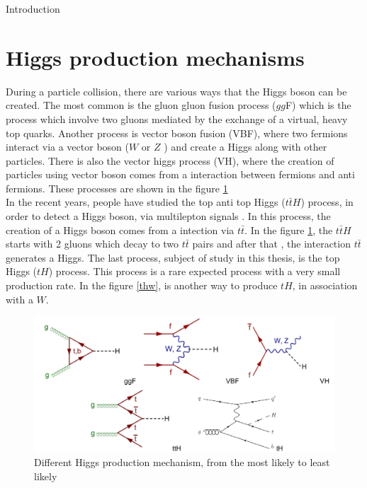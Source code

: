 \begin{chapter}{Introduction}
\pagebreak



\section{Higgs production mechanisms}
During a particle collision, there are various ways that the Higgs boson can be created. The most common is the gluon gluon fusion process ($gg$F) which is the process which involve two gluons  mediated by the exchange of a virtual, heavy top
quarks.  Another process  is vector boson fusion (VBF), where two fermions interact via a vector boson ($W$ or $Z$ ) and create a Higgs along with other particles. There is also the vector higgs process (VH), where the creation of particles using vector boson comes from a interaction between fermions and anti fermions\cite{pd}. These processes are shown in the figure \ref{psu} \\

In the recent years, people have studied the top anti top Higgs  ($t\bar{t}H$) process, in order to detect a Higgs boson, via multilepton signals \cite{th1}.
In this process, the creation of a Higgs boson comes from a intection via $t\bar{t}$. In the figure \ref{psu}, the $t\bar{t}H$ starts with 2 gluons which decay to two $t\bar{t}$ pairs and after that , the interaction $t\bar{t}$  generates a Higgs. The last process, subject of study in this thesis, is the top Higgs ($tH$) process. This process is a rare expected process with a very small production rate\cite{pd}.  In the figure \ref{thw}, is another way to produce $tH$, in association with a $W$.

\begin{figure}[htbp]
\centering
\includegraphics[scale=0.5]{Chapter1/pg.png}
\caption{Different Higgs production mechanism, from the most likely to least likely}
\label{psu}
\end{figure}



\end{chapter}

